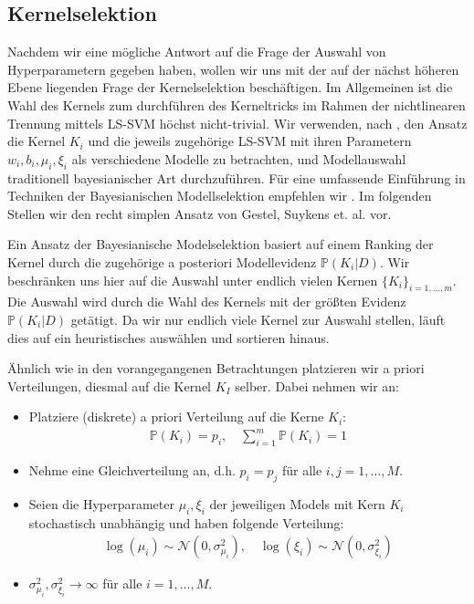 

\subsection{Kernelselektion}

Nachdem wir eine mögliche Antwort auf die Frage der Auswahl von Hyperparametern gegeben haben, wollen wir uns mit der auf der nächst höheren Ebene liegenden Frage der Kernelselektion beschäftigen. Im Allgemeinen ist die Wahl des Kernels zum durchführen des Kerneltricks im Rahmen der nichtlinearen Trennung mittels LS-SVM höchst nicht-trivial. Wir verwenden, nach \cite{LS-SVM}, den Ansatz die Kernel $K_i$ und die jeweils zugehörige LS-SVM mit ihren Parametern $w_i, b_i, \mu_i, \xi_i$ als verschiedene Modelle zu betrachten, und Modellauswahl traditionell bayesianischer Art durchzuführen. Für eine umfassende Einführung in Techniken der Bayesianischen Modellselektion empfehlen wir \cite{Bayes_model_selection}. Im folgenden Stellen wir den recht simplen Ansatz von Gestel, Suykens et. al. vor.

Ein Ansatz der Bayesianische Modelselektion basiert auf einem Ranking der Kernel durch die zugehörige a posteriori Modellevidenz $\mathbb{P}(K_i\vert D)$. Wir beschränken uns hier auf die Auswahl unter endlich vielen Kernen $\{K_i\}_{i=1,...,m}$. Die Auswahl wird durch die Wahl des Kernels mit der größten Evidenz $\mathbb{P}(K_i\vert D)$ getätigt. Da wir nur endlich viele Kernel zur Auswahl stellen, läuft dies auf ein heuristisches auswählen und sortieren hinaus.

Ähnlich wie in den vorangegangenen Betrachtungen platzieren wir a priori Verteilungen, diesmal auf die Kernel $K_I$ selber. Dabei nehmen wir an:

\begin{itemize}
	\item Platziere (diskrete) a priori Verteilung auf die Kerne $K_i$:
		\begin{align*}
		\mathbb{P}(K_i) = p_i,\quad \sum_{i=1}^{m} \mathbb{P}(K_i) = 1
		\end{align*}
	\item Nehme eine Gleichverteilung an, d.h. $p_i = p_j$ für alle $i,j = 1,\dots,M$.
	\item Seien die Hyperparameter $\mu_i, \xi_i$ der jeweiligen Models mit Kern $K_i$ 				  stochastisch unabhängig und haben folgende Verteilung:
		  \begin{align*}
				\log(\mu_i) \sim \mathcal{N}(0, \sigma_{\mu_i}^2), \quad\log(\xi_i) \sim 						\mathcal{N}(0, \sigma_{\xi_i}^2)
		  \end{align*}
	\item $\sigma_{\mu_i}^2, \sigma_{\xi_i}^2 \rightarrow \infty$ für alle $i = 1,\dots,M				   $.
\end{itemize}

